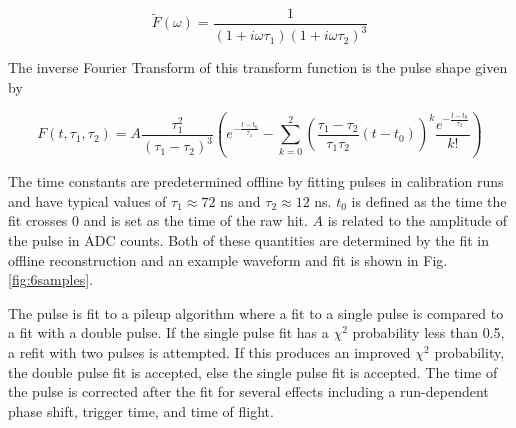 \begin{equation}
    \tilde{F}(\omega)=\frac{1}{(1+i \omega \tau_1)(1+i \omega \tau_2)^3}
    \label{equ:transfer}
\end{equation}

The inverse Fourier Transform of this transform function is the pulse shape given by

\begin{equation}
    F(t,\tau_1,\tau_2)=A \frac{\tau_1^2}{(\tau_1-\tau_2)^3} \left(  e^{-\frac{t-t_0}{\tau_1}}-\sum_{k=0}^2 \left( \frac{\tau_1-\tau_2}{\tau_1 \tau_2}(t-t_0) \right)^k \frac{e^{-\frac{t-t_0}{\tau_2}}}{k!} \right)
    \label{equ:sample_fits}
\end{equation}

The time constants are predetermined offline by fitting pulses in calibration runs and have typical values of $\tau_1 \approx 72$ ns and $\tau_2 \approx 12$ ns. $t_0$ is defined as the time the fit crosses 0 and is set as the time of the raw hit. $A$ is related to the amplitude of the pulse in ADC counts. Both of these quantities are determined by the fit in offline reconstruction and an example waveform and fit is shown in Fig. \ref{fig:6samples}.

The pulse is fit to a pileup algorithm where a fit to a single pulse is compared to a fit with a double pulse. If the single pulse fit has a $\chi^2$ probability less than 0.5, a refit with two pulses is attempted. If this produces an improved $\chi^2$ probability, the double pulse fit is accepted, else the single pulse fit is accepted. The time of the pulse is corrected after the fit for several effects including a run-dependent phase shift, trigger time, and time of flight. %

